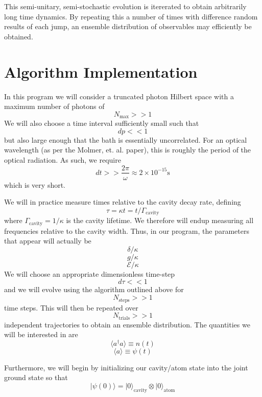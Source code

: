 \documentclass[11pt, oneside]{article}
\begin{document}
This semi-unitary, semi-stochastic evolution is itererated to obtain arbitrarily long time dynamics. By repeating this a number of times with difference random results of each jump, an ensemble distribution of observables may efficiently be obtained. 

\section{Algorithm Implementation}
In this program we will consider a truncated photon Hilbert space with a maximum number of photons of 
\[
N_{\textrm{max}} >>1
\]
We will also choose a time interval sufficiently small such that 
\[
dp << 1
\]
but also large enough that the bath is essentially uncorrelated. For an optical wavelength (as per the Molmer, et. al. paper), this is roughly the period of the optical radiation. As such, we require 
\[
dt >> \frac{2\pi}{\omega} \approx 2\times 10^{-15} \si{\s}
\]
which is very short.  

We will in practice measure times relative to the cavity decay rate, defining 
\[
\tau = \kappa t = t/\Gamma_{\textrm{cavity}}
\]
where $\Gamma_{\textrm{cavity}} = 1/\kappa$ is the cavity lifetime. We therefore will endup measuring all frequencies relative to the cavity width. Thus, in our program, the parameters that appear will actually be 
\[
\delta/\kappa
\]
\[
g/\kappa
\]
\[
\mathcal{E}/\kappa
\]
We will choose an appropriate dimensionless time-step 
\[
d\tau <<1
\]
and we will evolve using the algorithm outlined above for 
\[
N_{\textrm{steps}} >>1 
\]
time steps. This will then be repeated over 
\[
N_{\textrm{trials}} >>1 
\]
independent trajectories to obtain an ensemble distribution. The quantities we will be interested in are 
\[
\langle a^\dagger a \rangle \equiv n(t)
\]
\[
 \langle a \rangle \equiv \psi(t)
\]

Furthermore, we will begin by initializing our cavity/atom state into the joint ground state so that 
\[
|\psi(0)\rangle = |0\rangle_{\textrm{cavity}}\otimes |0\rangle_{\textrm{atom}}
\]
\end{document}
